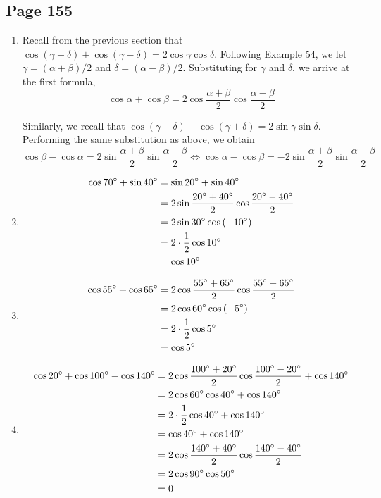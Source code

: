 \documentclass{article}
\newenvironment{solutions}[1]
{\subsection*{#1}
 \begin{enumerate}[leftmargin=1.5em]}
{\end{enumerate}}
\newcommand{\solution}{\item}
\begin{document}
\begin{solutions}{Page 155}
\solution %
Recall from the previous section that $\cos\left(\gamma+\delta\right) + \cos\left(\gamma-\delta\right) = 2\cos{\gamma}\cos{\delta}$. Following Example 54, we let $\gamma = \left(\alpha+\beta\right) / 2$ and $\delta = \left(\alpha - \beta\right) / 2$. Substituting for $\gamma$ and $\delta$, we arrive at the first formula,
\[
\cos{\alpha} + \cos{\beta} = 2\cos{\dfrac{\alpha+\beta}{2}}\cos{\dfrac{\alpha-\beta}{2}}
\]

Similarly, we recall that $\cos\left(\gamma-\delta\right) - \cos\left(\gamma+\delta\right) = 2\sin{\gamma}\sin{\delta}$. Performing the same substitution as above, we obtain
\[
\cos{\beta}-\cos{\alpha} = 2\sin{\dfrac{\alpha+\beta}{2}}\sin{\dfrac{\alpha-\beta}{2}} \iff \cos{\alpha}-\cos{\beta} = -2\sin{\dfrac{\alpha+\beta}{2}}\sin{\dfrac{\alpha-\beta}{2}}
\]
\solution %
\begin{align*}
\cos{70\degree}+\sin{40\degree} &= \sin{20\degree} + \sin{40\degree} \\
&= 2\sin{\dfrac{20\degree + 40\degree}{2}}\cos{\dfrac{20\degree-40\degree}{2}} \\
&= 2 \sin{30\degree}\cos\left(-10\degree\right) \\
&= 2 \cdot \dfrac{1}{2} \cos{10\degree} \\
&= \cos{10\degree}
\end{align*}

\solution %
\begin{align*}
\cos{55\degree} + \cos{65\degree} &= 2\cos{\dfrac{55\degree+65\degree}{2}}\cos{\dfrac{55\degree-65\degree}{2}} \\
&= 2\cos{60\degree}\cos\left(-5\degree\right) \\
&= 2\cdot \dfrac{1}{2}\cos{5\degree} \\
&= \cos{5\degree}
\end{align*}

\solution %
\begin{align*}
\cos{20\degree}+\cos{100\degree}+\cos{140\degree} &= 2\cos{\dfrac{100\degree+20\degree}{2}}\cos{\dfrac{100\degree-20\degree}{2}} + \cos{140\degree}\\
&= 2\cos{60\degree}\cos{40\degree} + \cos{140\degree} \\
&= 2\cdot \dfrac{1}{2} \cos{40\degree} + \cos{140\degree} \\
&= \cos{40\degree} + \cos{140\degree} \\
&= 2 \cos{\dfrac{140\degree+40\degree}{2}}\cos{\dfrac{140\degree-40\degree}{2}} \\
&= 2\cos{90\degree}\cos{50\degree} \\
&= 0
\end{align*}


\end{solutions}
\end{document}
